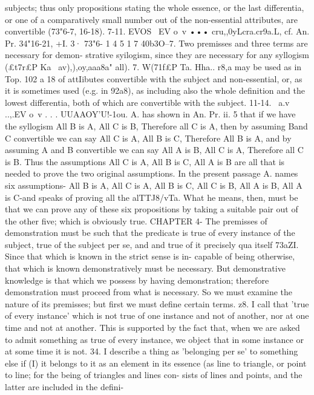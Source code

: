 {{{{{{subjects; thus only propositions stating the whole essence, or
the last differentia, or one of a comparatively small number out
of the non-essential attributes, are convertible (73"6-7, 16-18).
7-11. EVOS ~EV o~v ••• cru},},0yLcra.cr9a.L, cf. An. Pr. 34"16-21,
+I. 3· 73"6- 1 4
5 1 7
40b3O--7. Two premisses and three terms are necessary for demon-
strative syilogism, since they are necessary for any syllogism
(£t7r£P Ka~ av),),oy,aaa8a" all).
7. W(71f£P Ta. Hha.. r8,a may be used as in Top. 102 a 18 of
attIibutes convertible with the subject and non-essential, or, as
it is sometimes used (e.g. in 92a8), as including also the whole
definition and the lowest differentia, both of which are convertible
with the subject.
11-14. ~a.v ..,.EV o~v . . . UUAAOY'U!-1ou. A. has shown in An.
Pr. ii. 5 that if we have the syllogism All B is A, All C is B,
Therefore all C is A, then by assuming Band C convertible we
can say All C is A, All B is C, Therefore All B is A, and by
assuming A and B convertible we can say All A is B, All C is A,
Therefore all C is B. Thus the assumptions All C is A, All B is
C, All A is B are all that is needed to prove the two original
assumptions. In the present passage A. names six assumptions-
All B is A, All C is A, All B is C, All C is B, All A is B, All A is
C-and speaks of proving all the alTTJ8/vTa. What he means, then,
must be that we can prove any of these six propositions by taking
a suitable pair out of the other five; which is obviously true.
CHAPTER 4-
The premisses of demonstration must be such that the predicate is
true of every instance of the subject, true of the subject per se, and
and true of it precisely qua itself
73aZI. Since that which is known in the strict sense is in-
capable of being otherwise, that which is known demonstratively
must be necessary. But demonstrative knowledge is that which
we possess by having demonstration; therefore demonstration
must proceed from what is necessary. So we must examine the
nature of its premisses; but first we must define certain terms.
z8. I call that 'true of every instance' which is not true of one
instance and not of another, nor at one time and not at another.
This is supported by the fact that, when we are asked to admit
something as true of every instance, we object that in some
instance or at some time it is not.
34. I describe a thing as 'belonging per se' to something else
if (I) it belongs to it as an element in its essence (as line to
triangle, or point to line; for the being of triangles and lines con-
sists of lines and points, and the latter are included in the defini-
}}}}
